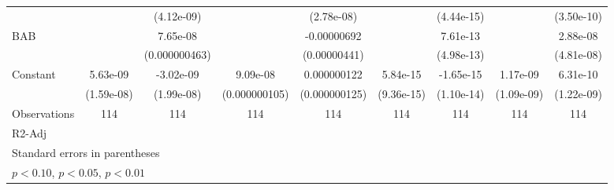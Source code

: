 \begin{table}[htbp]
\begin{tabular}{l*{8}{c}}
                    &                     &  (4.12e-09)         &                     &  (2.78e-08)         &                     &  (4.44e-15)         &                     &  (3.50e-10)         \\
[1em]
BAB                 &                     &    7.65e-08         &                     & -0.00000692         &                     &    7.61e-13         &                     &    2.88e-08         \\
                    &                     &(0.000000463)         &                     &(0.00000441)         &                     &  (4.98e-13)         &                     &  (4.81e-08)         \\
[1em]
Constant            &    5.63e-09         &   -3.02e-09         &    9.09e-08         & 0.000000122         &    5.84e-15         &   -1.65e-15         &    1.17e-09         &    6.31e-10         \\
                    &  (1.59e-08)         &  (1.99e-08)         &(0.000000105)         &(0.000000125)         &  (9.36e-15)         &  (1.10e-14)         &  (1.09e-09)         &  (1.22e-09)         \\
\hline
Observations        &         114         &         114         &         114         &         114         &         114         &         114         &         114         &         114         \\
R2-Adj              &                     &                     &                     &                     &                     &                     &                     &                     \\
\hline\hline
\multicolumn{9}{l}{\footnotesize Standard errors in parentheses}\\
\multicolumn{9}{l}{\footnotesize \sym{*} \(p<0.10\), \sym{**} \(p<0.05\), \sym{***} \(p<0.01\)}\\
\end{tabular}
\end{table}
